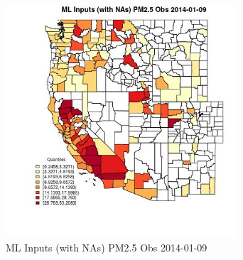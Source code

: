 \begin{figure} 
\centering  
\includegraphics[width=0.77\textwidth]{Code_Outputs/Report_ML_input_PM25_Step4_part_e_de_duplicated_aveswNAs_CountyPM25_ObsMean2014-01-09_2014-01-09.jpg} 
\caption{\label{fig:Report_ML_input_PM25_Step4_part_e_de_duplicated_aveswNAsCountyPM25_ObsMean2014-01-09_2014-01-09}ML Inputs (with NAs) PM2.5 Obs 2014-01-09} 
\end{figure} 
 
